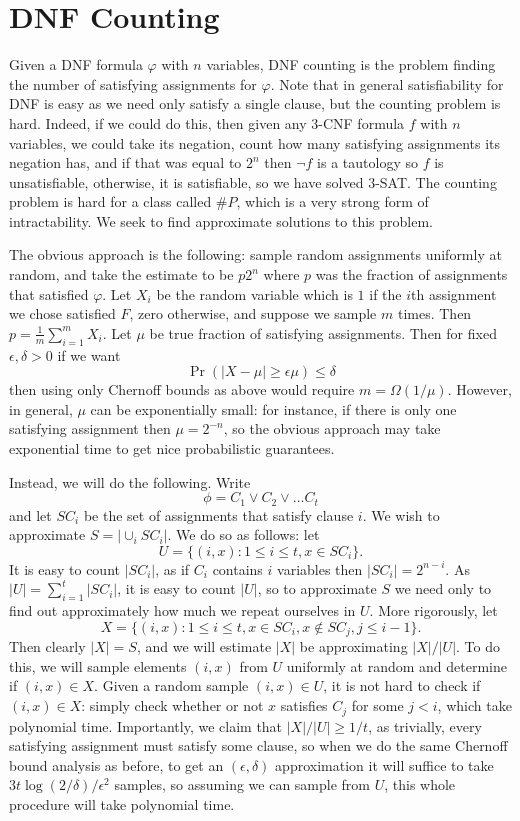 \section{DNF Counting}
Given a DNF formula $\varphi$ with $n$ variables, DNF counting is the problem finding the number of satisfying assignments for $\varphi$. Note that in general satisfiability for DNF is easy as we need only satisfy a single clause, but the counting problem is hard. Indeed, if we could do this, then given any 3-CNF formula $f$ with $n$ variables, we could take its negation, count how many satisfying assignments its negation has, and if that was equal to $2^n$ then $\neg f$ is a tautology so $f$ is unsatisfiable, otherwise, it is satisfiable, so we have solved 3-SAT. The counting problem is hard for a class called $\# P$, which is a very strong form of intractability. We seek to find approximate solutions to this problem.

The obvious approach is the following: sample random assignments uniformly at random, and take the estimate to be $p 2^n$ where $p$ was the fraction of assignments that satisfied $\varphi$. Let $X_i$ be the random variable which is $1$ if the $i$th assignment we chose satisfied $F$, zero otherwise, and suppose we sample $m$ times. Then $p = \frac{1}{m} \sum_{i = 1}^m X_i$. Let $\mu$ be true fraction of satisfying assignments. Then for fixed $\epsilon, \delta > 0$ if we want
\[\Pr (|X - \mu| \geq \epsilon \mu) \leq \delta\]
then using only Chernoff bounds as above would require $m = \Omega (1 / \mu)$. However, in general, $\mu$ can be exponentially small: for instance, if there is only one satisfying assignment then $\mu = 2^{-n}$, so the obvious approach may take exponential time to get nice probabilistic guarantees.

Instead, we will do the following. Write
\[\phi = C_1 \vee C_2 \vee \ldots C_t\]
and let $SC_i$ be the set of assignments that satisfy clause $i$. We wish to approximate $S = |\cup_i SC_i|$. We do so as follows: let
\[U = \{(i, x): 1 \leq i \leq t, x \in SC_i\}.\]
It is easy to count $|SC_i|$, as if $C_i$ contains $i$ variables then $|SC_i| = 2^{n - i}$. As $|U| = \sum_{i = 1}^t |SC_i|$, it is easy to count $|U|$, so to approximate $S$ we need only to find out approximately how much we repeat ourselves in $U$. More rigorously, let
\[X = \{(i, x): 1 \leq i \leq t, x \in SC_i, x \not\in SC_j, j \leq i - 1\}.\]
Then clearly $|X| = S$, and we will estimate $|X|$ be approximating $|X| / |U|$. To do this, we will sample elements $(i, x)$ from $U$ uniformly at random and determine if $(i, x) \in X$. Given a random sample $(i, x) \in U$, it is not hard to check if $(i, x) \in X$: simply check whether or not $x$ satisfies $C_j$ for some $j < i$, which take polynomial time. Importantly, we claim that $|X| / |U| \geq 1 / t$, as trivially, every satisfying assignment must satisfy some clause, so when we do the same Chernoff bound analysis as before, to get an $(\epsilon, \delta)$ approximation it will suffice to take $3 t \log (2 / \delta) / \epsilon^2$ samples, so assuming we can sample from $U$, this whole procedure will take polynomial time.

